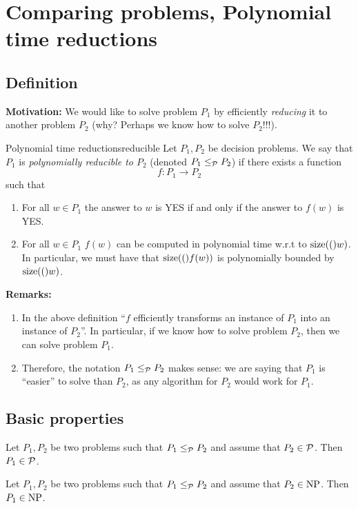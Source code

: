 \section{Comparing problems, Polynomial time reductions}
\subsection{Definition}
{\bf Motivation:} We would like to solve problem $P_1$ by efficiently {\em reducing} it to another problem $P_2$ (why? Perhaps we know how to solve $P_2$!!!).

	\begin{definition}{Polynomial time reductions}{reducible}
Let $P_1,P_2$ be decision problems. We say that $P_1$ is {\em polynomially reducible to $P_2$} (denoted $P_1\leq_{{\mathcal{P}}}P_2$) if there exists a function
$$f:P_1\rightarrow P_2$$
such that 
\begin{enumerate}
	\item For all $w\in P_1$ the answer to $w$ is YES if and only if the answer to $f(w)$ is YES.
	\item For all $w\in P_1$ $f(w)$ can be computed in polynomial time w.r.t to $\mathrm{size}(()w)$. In particular, we must have that $\mathrm{size}(()f(w))$ is polynomially bounded by $\mathrm{size}(()w)$.
\end{enumerate}
\end{definition}

{\bf Remarks:} \begin{enumerate}
	\item In the above definition ``$f$ efficiently transforms an instance of $P_1$ into an instance of $P_2$''. In particular, if we know how to solve problem $P_2$, then we can solve problem $P_1$.
	\item Therefore, the notation $P_1\leq_{{\mathcal{P}}}P_2$ makes sense: we are saying that $P_1$ is ``easier'' to solve than $P_2$, as any algorithm for $P_2$ would work for $P_1$. 
\end{enumerate} 
\subsection{Basic properties}

\begin{proposition}{}{} Let $P_1,P_2$ be two problems such that $P_1\leq_{{\mathcal{P}}}P_2$ and assume that $P_2\in {\mathcal{P}}$. Then $P_1\in{\mathcal{P}}$.
\end{proposition}

\begin{proposition}{}{} Let $P_1,P_2$ be two problems such that $P_1\leq_{{\mathcal{P}}}P_2$ and assume that $P_2\in \mbox{NP}$. Then $P_1\in\mbox{NP}$.
\end{proposition}

